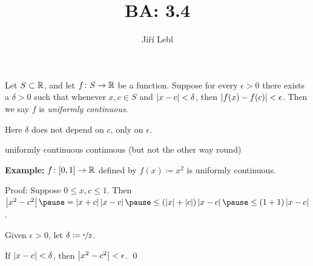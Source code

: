 \documentclass[10pt,aspectratio=169]{beamer}
\author{Ji\v{r}\'i Lebl}
\institute[OSU]{%
Departemento pri Matematiko de Oklahoma {\^S}tata Universitato}
\title{BA: 3.4}
\date{}
\begin{document}
\begin{frame}
\titlepage
\end{frame}

\begin{frame}
\begin{definition}
Let $S \subset {\mathbb{R}}$, and let $f \colon S \to {\mathbb{R}}$ be a function.
Suppose for every $\epsilon > 0$ there exists a $\delta > 0$
such that whenever $x, c \in S$ and
$\left\lvert {x-c} \right\rvert < \delta$, then $\left\lvert {f(x)-f(c)} \right\rvert < \epsilon$.
Then we say $f$ is \emph{uniformly continuous}.
\end{definition}

\pause
Here $\delta$ does not depend on $c$, only on $\epsilon$.

\pause
\medskip

uniformly continuous \wthus continuous \quad (but not the other way round)

\pause
\medskip

\textbf{Example:}
$f \colon [0,1] \to {\mathbb{R}}$ defined by $f(x) \coloneqq x^2$ is uniformly continuous.

\pause
\medskip

Proof: Suppose $0 \leq x,c \leq 1$.  Then
$\abs{x^2-c^2}
\pause
= \abs{x+c}\abs{x-c}
\pause
\leq (\abs{x}+\abs{c}) \abs{x-c}
\pause
\leq (1+1)\abs{x-c}$.

\pause
Given $\epsilon > 0$, let $\delta \coloneqq \nicefrac{\epsilon}{2}$.

\pause
If $\left\lvert {x-c} \right\rvert < \delta$, then $\left\lvert {x^2-c^2} \right\rvert < \epsilon$.
\qed

\end{frame}
\end{document}
